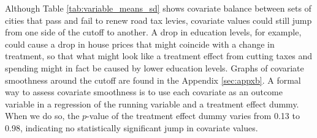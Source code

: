 Although Table \ref{tab:variable_means_sd} shows covariate balance between sets of cities that pass and fail to renew road tax levies, covariate values could still jump from one side of the cutoff to another. A drop in education levels, for example, could cause a drop in house prices that might coincide with a change in treatment, so that what might look like a treatment effect from cutting taxes and spending might in fact be caused by lower education levels.  Graphs of covariate smoothness around the cutoff are found in the Appendix \ref{sec:appxb}. A formal way to assess covariate smoothness is to use each covariate as an outcome variable in a regression of the running variable and a treatment effect dummy. When we do so, the $p$-value of the treatment effect dummy varies from 0.13 to 0.98, indicating no statistically significant jump in covariate values. 
